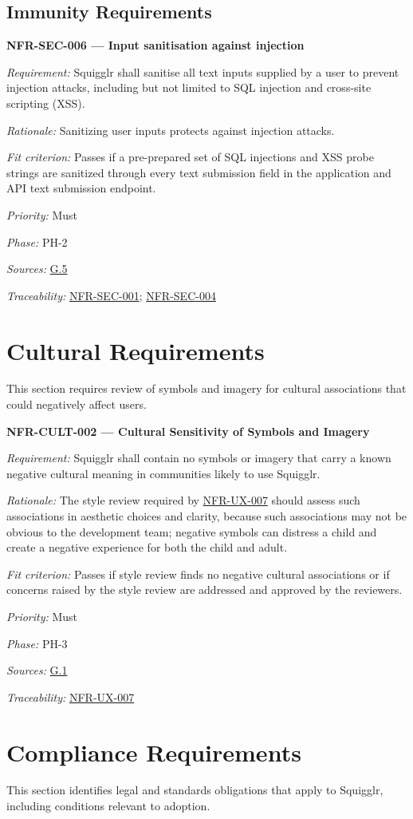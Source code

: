 \documentclass[12pt]{article}
\renewcommand{\_}{\textunderscore\allowbreak}%
\newcommand{\goalref}[1]{\hyperref[goal:#1]{G.#1}}
\newenvironment{srsrequirement}[2]{%
  \par\medskip\noindent\phantomsection\label{req:#1}%
  \textbf{#1 --- #2}\par\nobreak\smallskip }{\par\medskip}
\newcommand{\reqfield}[2]{\noindent\textit{#1:} #2\par}
\newcommand{\reqshall}[1]{\reqfield{Requirement}{#1}}
\newcommand{\reqrationale}[1]{\reqfield{Rationale}{#1}}
\newcommand{\reqfit}[1]{\reqfield{Fit criterion}{#1}}
\newcommand{\reqpriority}[1]{\reqfield{Priority}{#1}}
\newcommand{\reqphase}[1]{\reqfield{Phase}{#1}}
\newcommand{\reqsources}[1]{\reqfield{Sources}{#1}}
\newcommand{\reqtraces}[1]{\reqfield{Traceability}{#1}}
\newcommand{\reqref}[1]{\hyperref[req:#1]{#1}}
\begin{document}
\subsection{Immunity Requirements}

\begin{srsrequirement}{NFR-SEC-006}{Input sanitisation against injection}
  \reqshall{Squigglr shall sanitise all text inputs supplied by a user to
prevent injection attacks, including but not limited to SQL injection and
cross-site scripting (XSS).}
  \reqrationale{Sanitizing user inputs protects against injection attacks.}
  \reqfit{Passes if a pre-prepared set of SQL injections and XSS probe strings
  are sanitized through every text submission field in the application and API
  text submission endpoint.}
  \reqpriority{Must}
  \reqphase{PH-2}
  \reqsources{\goalref{5}} \reqtraces{\reqref{NFR-SEC-001};
  \reqref{NFR-SEC-004}}
\end{srsrequirement}


\section{Cultural Requirements}
This section requires review of symbols and imagery for cultural associations
that could negatively affect users.

\begin{srsrequirement}{NFR-CULT-002}{Cultural Sensitivity of Symbols and Imagery}
  \reqshall{Squigglr shall contain no symbols or imagery that carry a known
negative cultural meaning in communities likely to use Squigglr.}
\reqrationale{The style review required by \reqref{NFR-UX-007} should assess
such associations in aesthetic choices and clarity, because such associations
may not be obvious to the development team; negative symbols can distress a
child and create a negative experience for both the child and adult.}
\reqfit{Passes if style review finds no negative cultural associations or if
concerns raised by the style review are addressed and approved by the
reviewers.}
  \reqpriority{Must}
  \reqphase{PH-3}
  \reqsources{\goalref{1}} \reqtraces{\reqref{NFR-UX-007}}
\end{srsrequirement}


\section{Compliance Requirements}
This section identifies legal and standards obligations that apply to Squigglr,
including conditions relevant to adoption.
\end{document}
